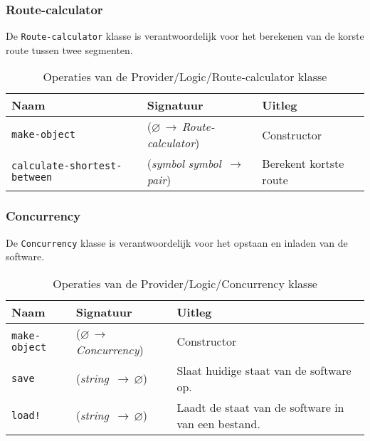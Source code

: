 \documentclass[a4paper, 11pt]{article}
\newcommand{\naar}{\,$\rightarrow$\,}
\renewcommand{\empty}{$\varnothing$}
\newcommand{\<}{\scriptsize\textless\normalsize}
\renewcommand{\>}{\scriptsize\textgreater\normalsize}
\begin{document}
\subsubsection{Route-calculator} %
De \texttt{Route-calculator} klasse is verantwoordelijk voor het berekenen van de korste route tussen twee segmenten.
\begin{table}[H]
	\begin{center}
		\begin{tabular}{|l l l|}
			\hline
			\textbf{Naam} & \textbf{Signatuur} & \textbf{Uitleg}\\
			\hline
			\texttt{make-object} & (\empty \naar \textit{Route-calculator}) & Constructor\\
			\hline
			\texttt{calculate-shortest-between} & (\textit{symbol} \textit{symbol} \naar \textit{pair}) & Berekent kortste route\\
			\hline
		\end{tabular}
		\caption{Operaties van de Provider/Logic/Route-calculator klasse}
	\end{center}
\end{table}

\newpage

\subsubsection{Concurrency} %
De \texttt{Concurrency} klasse is verantwoordelijk voor het opstaan en inladen van de software.
\begin{table}[H]
	\begin{center}
		\begin{tabular}{|l l l|}
			\hline
			\textbf{Naam} & \textbf{Signatuur} & \textbf{Uitleg}\\
			\hline
			\texttt{make-object} & (\empty \naar \textit{Concurrency}) & Constructor\\
			\hline
			\texttt{save} & (\textit{string} \naar \empty) & Slaat huidige staat van de software op.\\
			\texttt{load!} & (\textit{string} \naar \empty) & Laadt de staat van de software in van een bestand.\\
			\hline
		\end{tabular}
		\caption{Operaties van de Provider/Logic/Concurrency klasse}
	\end{center}
\end{table}
\end{document}

